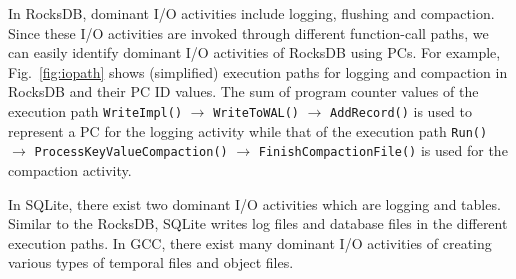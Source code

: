 In RocksDB, dominant I/O activities include logging, flushing and compaction.
Since these I/O activities are invoked through different 
function-call paths, we can easily
identify dominant I/O activities of RocksDB using PCs.  
For example, Fig.~\ref{fig:iopath} shows 
(simplified) execution paths for 
logging and compaction in RocksDB and their PC ID values.  
The sum of program counter values of the execution path
\texttt{WriteImpl()} $\rightarrow$ \texttt{WriteToWAL()} $\rightarrow$ \texttt{AddRecord()} is used
to represent a PC for the logging activity while that of the execution path
\texttt{Run()} $\rightarrow$
\texttt{ProcessKeyValueCompaction()} $\rightarrow$ \texttt{FinishCompactionFile()} is used
for the compaction activity.

{\color{blue}
In SQLite, there exist two dominant I/O activities which are logging and tables.
Similar to the RocksDB, SQLite writes log files and database files in the different
execution paths.
In GCC, there exist many dominant I/O activities of creating various types of 
temporal files and object files.
}


